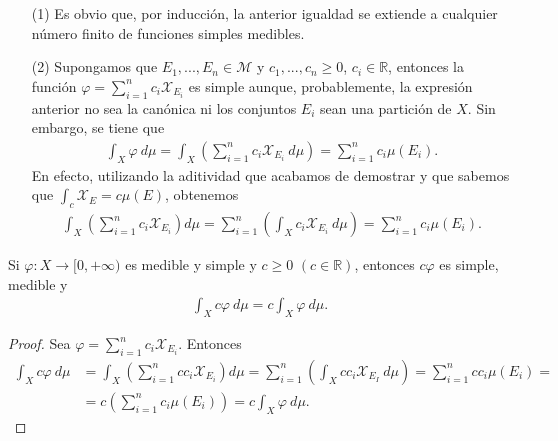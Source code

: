 \begin{obs}
    \begin{enumerate}
        \item[(1)] Es obvio que, por inducción, la anterior igualdad se extiende a cualquier número finito de funciones simples medibles.
        \item[(2)] Supongamos que $E_1, ..., E_n \in \mathcal{M}$ y $c_1, ...,c_n \ge 0$, $c_i \in \mathbb{R}$, entonces la función $\varphi = \sum_{i=1}^{n}{c_i \mathcal{X}_{E_i}}$ es simple aunque, probablemente, la expresión anterior no sea la canónica ni los conjuntos $E_i$ sean una partición de $X$. Sin embargo, se tiene que
              \begin{align*}
                  \int_{X}{\varphi \ d\mu} = \int_{X}{\left(  \sum_{i=1}^{n}{c_i \mathcal{X}_{E_i} \ d\mu}\right)} = \sum_{i=1}^{n}{c_i\mu(E_i)}.
              \end{align*}
              En efecto, utilizando la aditividad que acabamos de demostrar y que sabemos que $\int_{c}{\mathcal{X}_E} = c\mu(E)$, obtenemos
              \begin{align*}
                  \int_{X}{\left(  \sum_{i=1}^{n}{c_i \mathcal{X}_{E_i}}\right) d\mu} = \sum_{i=1}^{n}{\left( \int_{X}{c_i \mathcal{X}_{E_i} \ d\mu} \right)} = \sum_{i=1}^{n}{c_i\mu(E_i)}.
              \end{align*}
    \end{enumerate}
\end{obs}
\begin{prop}
    Si $\varphi: X \longrightarrow [0,+\infty)$ es medible y simple y $c \ge 0$ $(c \in \mathbb{R})$, entonces $c\varphi$ es simple, medible y
    \begin{align*}
        \int_{X}{c\varphi \ d\mu} = c\int_{X}{\varphi \ d\mu}.
    \end{align*}
\end{prop}

\begin{proof}
    Sea $\varphi = \sum_{i=1}^{n}{c_i \mathcal{X}_{E_i}}$. Entonces
    \begin{align*}
        \int_{X}{c\varphi \ d\mu} & = \int_{X}{\left( \sum_{i=1}^{n}{cc_i \mathcal{X}_{E_i}} \right) d\mu} = \sum_{i=1}^{n}{\left( \int_{X}{cc_i \mathcal{X}_{E_I} \ d\mu} \right)} =  \sum_{i=1}^{n}{cc_i\mu(E_i)} = \\
                                  & = c \left( \sum_{i=1}^{n}{c_i\mu(E_i)}\right) = c \int_{X}{\varphi \ d\mu}.
    \end{align*}
\end{proof}

